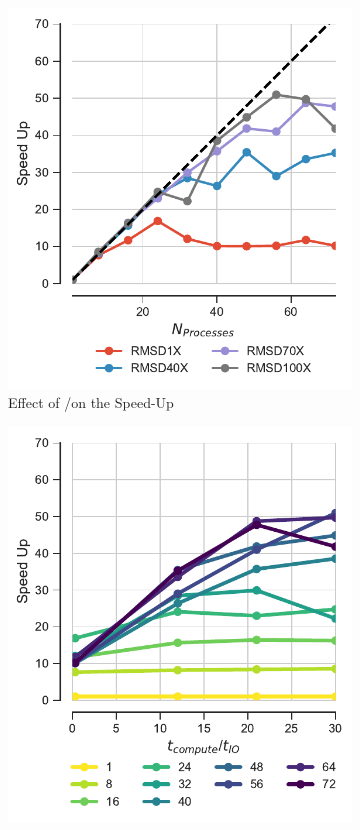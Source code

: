 \begin{figure}
\centering
\begin{subfigure} {.3\textwidth}
  \includegraphics[width=\linewidth]{figures/Compute_to_IO_ratio_on_performance_2d_v17.pdf}
  \caption{Effect of \tcomp/\tIO on the Speed-Up}
  \label{fig:S1_tcomp_tIO_effect}
\end{subfigure}
\hfill
\begin{subfigure}{.3\textwidth}
  \includegraphics[width=\linewidth]{figures/Compute_to_IO_ratio_on_performance_2d_2_v17.pdf}

\end{subfigure}
\end{figure}
